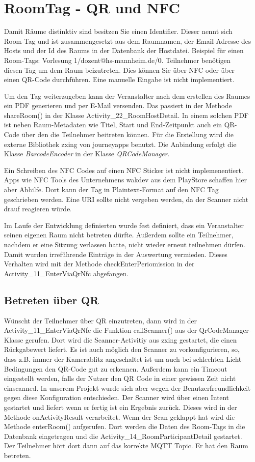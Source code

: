 \section{RoomTag - QR und NFC}
\label{sec:RoomTag - QR und NFC}
Damit Räume distinktiv sind besitzen Sie einen Identifier. Dieser nennt sich Room-Tag und ist zusammengesetzt aus dem Raumnamen, der Email-Adresse des Hosts und der Id des Raums in der Datenbank der Hostdatei. Beispiel für einen Room-Tags: Vorlesung 1/dozent@hs-mannheim.de/0.
Teilnehmer benötigen diesen Tag um dem Raum beizutreten. Dies können Sie über NFC oder über einen QR-Code durchführen. Eine manuelle Eingabe ist nicht implementiert.

Um den Tag weiterzugeben kann der Veranstalter nach dem erstellen des Raumes ein PDF generieren und per E-Mail versenden. 
Das passiert in der Methode shareRoom() in der Klasse Activity\_22\_RoomHostDetail. 
In einem solchen PDF ist neben Raum-Metadaten wie Titel, Start und End-Zeitpunkt auch ein QR-Code über den die Teilnehmer beitreten können. 
Für die Erstellung wird die externe Bibliothek zxing von journeyapps benutzt. Die Anbindung erfolgt die Klasse \textit{BarcodeEncoder} in der Klasse \textit{QRCodeManager}.

Ein Schreiben des NFC Codes auf einen NFC Sticker ist nicht implemenentiert.
 Apps wie NFC Tools des Unternehmens wakdev aus dem PlayStore schaffen hier aber Abhilfe. Dort kann der Tag in Plaintext-Format auf den NFC Tag geschrieben werden.
Eine URI sollte nicht vergeben werden, da der Scanner nicht drauf reagieren würde.

Im Laufe der Entwicklung definierten wurde fest definiert, dass ein Veranstalter seinen eigenen Raum nicht betreten dürfte.
 Außerdem sollte ein Teilnehmer, nachdem er eine Sitzung verlassen hatte, nicht wieder erneut teilnehmen dürfen. 
 Damit wurden irreführende Einträge in der Auswertung vermieden. Dieses Verhalten wird mit der Methode checkEnterPeriomission in der Activity\_11\_EnterViaQrNfc abgefangen.
\subsection{Betreten über QR}
\label{subsec: Betreten über QR}
Wünscht der Teilnehmer über QR einzutreten, dann wird in der Activity\_11\_EnterViaQrNfc die Funktion callScanner() aus der QrCodeManager-Klasse gerufen. Dort wird die Scanner-Activitiy aus zxing gestartet, die einen Rückgabewert liefert. Es ist auch möglich den Scanner zu vorkonfigurieren, so, dass z.B. immer der Kamerablitz angeschaltet ist um auch bei schlechten Licht-Bedingungen den QR-Code gut zu erkennen. 
Außerdem kann ein Timeout eingestellt werden, falls der Nutzer den QR Code in einer gewissen Zeit nicht einscanned.
In unserem Projekt wurde sich aber wegen der Benutzerfreundlichkeit gegen diese Konfiguration entschieden.
Der Scanner wird über einen Intent gestartet und liefert wenn er fertig ist ein Ergebnis zurück.
Dieses wird in der Methode onActivityResult verarbeitet. Wenn der Scan geklappt hat wird die Methode enterRoom() aufgerufen. Dort werden die Daten des Room-Tags in die Datenbank eingetragen und die Activity\_14\_RoomParticipantDetail gestartet. Der Teilnehmer hört dort dann auf das korrekte MQTT Topic. Er hat den Raum betreten.
